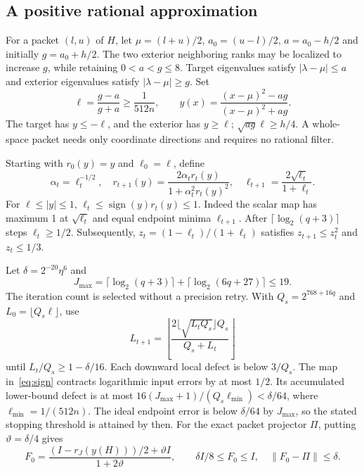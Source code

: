 \documentclass[11pt]{article}
\theoremstyle{remark}\newtheorem{remark}[theorem]{Remark}
\newcommand{\norm}[1]{\left\lVert#1\right\rVert}
\newcommand{\abs}[1]{\left\lvert#1\right\rvert}
\begin{document}
\subsection{A positive rational approximation}
For a packet $(l,u)$ of $H$, let $\mu=(l+u)/2$, $a_0=(u-l)/2$,
$a=a_0-h/2$ and initially $g=a_0+h/2$. The two exterior neighboring ranks
may be localized to increase $g$, while retaining $0<a<g\le8$. Target
eigenvalues satisfy $\abs{\lambda-\mu}\le a$ and exterior eigenvalues
satisfy $\abs{\lambda-\mu}\ge g$. Set
\[
 \ell=\frac{g-a}{g+a}\ge\frac1{512n},\qquad
 y(x)=\frac{(x-\mu)^2-ag}{(x-\mu)^2+ag}.
\]
The target has $y\le-\ell$, and the exterior has $y\ge\ell$;
$\sqrt{ag}\ell\ge h/4$. A whole-space packet needs only coordinate
directions and requires no rational filter.

Starting with $r_0(y)=y$ and $\ell_0=\ell$, define
\begin{equation}\label{eq:sign}
 \alpha_t=\ell_t^{-1/2},\quad
 r_{t+1}(y)=\frac{2\alpha_t r_t(y)}{1+\alpha_t^2r_t(y)^2},\quad
 \ell_{t+1}=\frac{2\sqrt{\ell_t}}{1+\ell_t}.
\end{equation}
For $\ell\le\abs y\le1$,
$\ell_t\le\operatorname{sign}(y)r_t(y)\le1$. Indeed the scalar map has
maximum 1 at $\sqrt{\ell_t}$ and equal endpoint minima $\ell_{t+1}$.
After $\lceil\log_2(q+3)\rceil$ steps $\ell_t\ge1/2$. Subsequently,
$z_t=(1-\ell_t)/(1+\ell_t)$ satisfies $z_{t+1}\le z_t^2$ and $z_t\le1/3$.

Let $\delta=2^{-20}\eta^6$ and
\[
 J_{\max}=\lceil\log_2(q+3)\rceil+
            \lceil\log_2(6q+27)\rceil\le19.
\]
The iteration count is selected without a precision retry. With
$Q_s=2^{768+16q}$ and $L_0=\lfloor Q_s\ell\rfloor$, use
\begin{equation}\label{eq:down}
 L_{t+1}=\left\lfloor
 \frac{2\lfloor\sqrt{L_tQ_s}\rfloor Q_s}{Q_s+L_t}
 \right\rfloor
\end{equation}
until $L_t/Q_s\ge1-\delta/16$. Each downward local defect is below $3/Q_s$.
The map in~\eqref{eq:sign} contracts logarithmic input errors by at most
$1/2$. Its accumulated lower-bound defect is at most
$16(J_{\max}+1)/(Q_s\ell_{\min})<\delta/64$, where
$\ell_{\min}=1/(512n)$. The ideal endpoint error is below $\delta/64$
by $J_{\max}$, so the stated stopping threshold is attained by then.
For the exact packet projector $\Pi$, putting $\vartheta=\delta/4$ gives
\begin{equation}\label{eq:filter}
 F_0=\frac{(I-r_J(y(H)))/2+\vartheta I}{1+2\vartheta},
 \qquad \delta I/8\le F_0\le I,\quad \norm{F_0-\Pi}\le\delta.
\end{equation}
\end{document}
